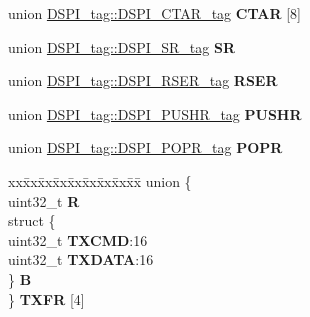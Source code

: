 \begin{DoxyCompactItemize}
\begin{tabbing}
\end{tabbing}\item 
\mbox{\label{structDSPI__tag_a03dd4e6abb5dac84c0bdb8d7888c5bb8}} 
union \mbox{\hyperlink{unionDSPI__tag_1_1DSPI__CTAR__tag}{D\+S\+P\+I\+\_\+tag\+::\+D\+S\+P\+I\+\_\+\+C\+T\+A\+R\+\_\+tag}} {\bfseries C\+T\+AR} \mbox{[}8\mbox{]}
\item 
\mbox{\label{structDSPI__tag_a475bd2eab95c864d8df6e325713d8aa7}} 
union \mbox{\hyperlink{unionDSPI__tag_1_1DSPI__SR__tag}{D\+S\+P\+I\+\_\+tag\+::\+D\+S\+P\+I\+\_\+\+S\+R\+\_\+tag}} {\bfseries SR}
\item 
\mbox{\label{structDSPI__tag_adddcab46974f82e32c3ddb83bc3fd131}} 
union \mbox{\hyperlink{unionDSPI__tag_1_1DSPI__RSER__tag}{D\+S\+P\+I\+\_\+tag\+::\+D\+S\+P\+I\+\_\+\+R\+S\+E\+R\+\_\+tag}} {\bfseries R\+S\+ER}
\item 
\mbox{\label{structDSPI__tag_ac8abc69acf765c05870b16b90dbb8977}} 
union \mbox{\hyperlink{unionDSPI__tag_1_1DSPI__PUSHR__tag}{D\+S\+P\+I\+\_\+tag\+::\+D\+S\+P\+I\+\_\+\+P\+U\+S\+H\+R\+\_\+tag}} {\bfseries P\+U\+S\+HR}
\item 
\mbox{\label{structDSPI__tag_aa73ea4742d0368162a3b8c5cd0af3478}} 
union \mbox{\hyperlink{unionDSPI__tag_1_1DSPI__POPR__tag}{D\+S\+P\+I\+\_\+tag\+::\+D\+S\+P\+I\+\_\+\+P\+O\+P\+R\+\_\+tag}} {\bfseries P\+O\+PR}
\item 
\mbox{\label{structDSPI__tag_ac2d26da477879b329f3cad8288025f8e}} 
\begin{tabbing}
xx\=xx\=xx\=xx\=xx\=xx\=xx\=xx\=xx\=\kill
union \{\\
\>uint32\_t {\bfseries R}\\
\>struct \{\\
\>\>uint32\_t {\bfseries TXCMD}:16\\
\>\>uint32\_t {\bfseries TXDATA}:16\\
\>\} {\bfseries B}\\
\} {\bfseries TXFR} \mbox{[}4\mbox{]}\\


\end{tabbing}
\end{DoxyCompactItemize}
